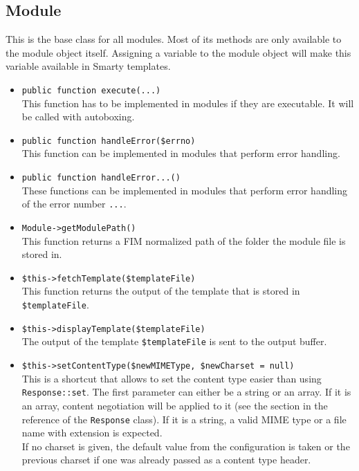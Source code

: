 \documentclass{scrartcl}
\begin{document}
   \subsection{Module}
      This is the base class for all modules. Most of its methods are only available to the module object itself. Assigning a variable to the module object will make this variable available in Smarty templates.
      \begin{itemize}
         \item \lstinline!public function execute(...)! \\
            This function has to be implemented in modules if they are executable. It will be called with autoboxing.
         \item \lstinline!public function handleError($errno)! \\
            This function can be implemented in modules that perform error handling.
         \item \lstinline!public function handleError...()! \\
            These functions can be implemented in modules that perform error handling of the error number \lstinline!...!.
         \item \lstinline!Module->getModulePath()! \\
            This function returns a FIM normalized path of the folder the module file is stored in.
         \item \lstinline!$this->fetchTemplate($templateFile)! \\
            This function returns the output of the template that is stored in \lstinline!$templateFile!.
         \item \lstinline!$this->displayTemplate($templateFile)! \\
            The output of the template \lstinline!$templateFile! is sent to the output buffer.
         \item \lstinline!$this->setContentType($newMIMEType, $newCharset = null)! \\
            This is a shortcut that allows to set the content type easier than using \lstinline!Response::set!. The first parameter can either be a string or an array. If it is an array, content negotiation will be applied to it (see the section in the reference of the \lstinline!Response! class). If it is a string, a valid MIME type or a file name with extension is expected. \\
            If no charset is given, the default value from the configuration is taken or the previous charset if one was already passed as a content type header.

\end{itemize}
\end{document}
